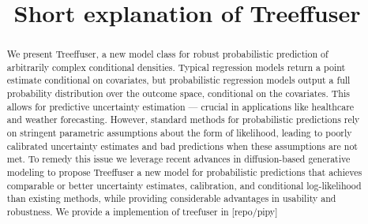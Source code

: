 \documentclass{article} %
\title{Short explanation of Treeffuser}
\author{}
\begin{document}
\maketitle

\begin{abstract}
We present Treeffuser, a new model class for robust probabilistic prediction of arbitrarily complex conditional densities. Typical regression models return a point estimate conditional on covariates, but probabilistic regression models output a full probability distribution over the outcome space, conditional on the covariates. This allows for predictive uncertainty estimation — crucial in applications like healthcare and weather forecasting.  However, standard methods for probabilistic predictions rely on stringent parametric assumptions about the form of likelihood, leading to poorly calibrated uncertainty estimates and bad predictions when these assumptions are not met.  To remedy this issue we leverage recent advances in diffusion-based generative modeling to propose Treeffuser a new model for probabilistic predictions that achieves comparable or better uncertainty estimates, calibration, and conditional log-likelihood than existing methods, while providing considerable advantages in usability and robustness. We provide a implemention of treefuser in [repo/pipy]

\end{abstract}

\begin{flushleft}


%

\end{flushleft}




\end{document}
